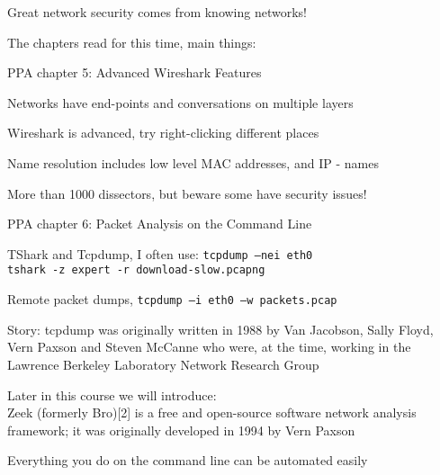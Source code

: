 \documentclass[Screen16to9,17pt]{foils}
\begin{document}
\vskip 5mm
\centerline{\Large Great network security comes from knowing networks!}


\begin{list1}
\item The chapters read for this time, main things:
\item PPA chapter 5: Advanced Wireshark Features
\begin{list2}
\item Networks have end-points and conversations on multiple layers
\item Wireshark is advanced, try right-clicking different places
\item Name resolution includes low level MAC addresses, and IP - names
\item More than 1000 dissectors, but beware some have security issues!
\end{list2}
\end{list1}


\begin{list1}
\item PPA chapter 6: Packet Analysis on the Command Line
\begin{list2}
\item TShark and Tcpdump, I often use: \verb+tcpdump –nei eth0+\\
\verb+tshark -z expert -r download-slow.pcapng+

\item Remote packet dumps, \verb+tcpdump –i eth0 –w packets.pcap+
\end{list2}
\item Story: tcpdump was originally written in 1988 by Van Jacobson, Sally Floyd, Vern Paxson and Steven McCanne who were, at the time, working in the Lawrence Berkeley Laboratory Network Research Group

\item Later in this course we will introduce:\\
Zeek (formerly Bro)[2] is a free and open-source software network analysis framework; it was originally developed in 1994 by Vern Paxson
\end{list1}

\vskip 5mm
\centerline{\Large Everything you do on the command line can be automated easily}
\end{document}
